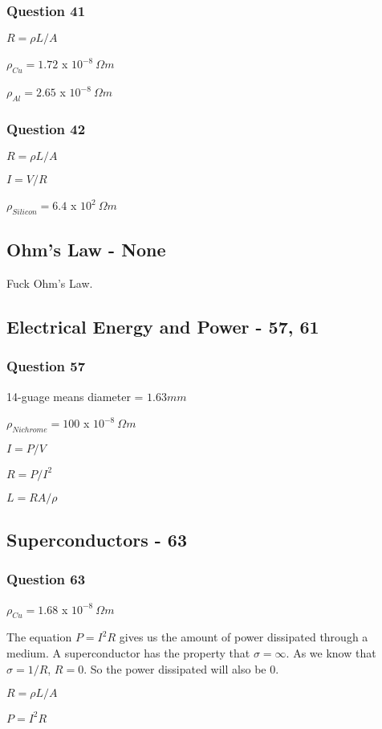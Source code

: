 \documentclass[12pt, letterpaper, twoside]{article}
\begin{document}
    \subsubsection*{Question 41}
      \begin{description}
        \item $R = \rho L / A$   
        \item $\rho_{Cu} = 1.72$ x $10^{-8} \ \Omega m$
        \item $\rho_{Al} = 2.65$ x $10^{-8} \ \Omega m$
      \end{description}
    \subsubsection*{Question 42}
      \begin{description}
        \item $R = \rho L / A$
        \item $I = V / R$
        \item $\rho_{Silicon} = 6.4$ x $10^2 \ \Omega m$
      \end{description}
  \subsection{Ohm's Law - None}
    Fuck Ohm's Law.
  \subsection{Electrical Energy and Power - 57, 61}
    \subsubsection*{Question 57}
      \begin{description}
        \item 14-guage means diameter = $1.63mm$
        \item $\rho_{Nichrome} = 100$ x $10^{-8} \ \Omega m$
        \item $I = P/V$
        \item $R = P/I^2$
        \item $L = RA/\rho$
      \end{description}
  \subsection{Superconductors - 63}
    \subsubsection*{Question 63}
      \begin{description}
        \item $\rho_{Cu} = 1.68$ x $10^{-8} \ \Omega m$
        \item The equation $P = I^2R$ gives us the amount of power dissipated through a medium. A superconductor has the property that $\sigma = \infty$. As we know that $\sigma = 1/R$, $R = 0$. So the power dissipated will also be 0.
        \item $R = \rho L / A$
        \item $P = I^2R$
      \end{description}
\end{document}
